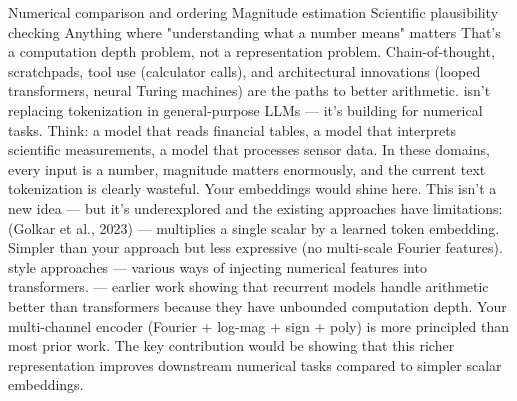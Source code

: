 {}\markdownRendererUlBeginTight
\markdownRendererUlItem Numerical comparison and ordering\markdownRendererUlItemEnd 
\markdownRendererUlItem Magnitude estimation\markdownRendererUlItemEnd 
\markdownRendererUlItem Scientific plausibility checking\markdownRendererUlItemEnd 
\markdownRendererUlItem Anything where "understanding what a number means" matters\markdownRendererUlItemEnd 
\markdownRendererUlEndTight \markdownRendererInterblockSeparator
{} That's a computation depth problem, not a representation problem. Chain-of-thought, scratchpads, tool use (calculator calls), and architectural innovations (looped transformers, neural Turing machines) are the paths to better arithmetic.\markdownRendererParagraphSeparator
{} isn't replacing tokenization in general-purpose LLMs — it's building  for numerical tasks. Think: a model that reads financial tables, a model that interprets scientific measurements, a model that processes sensor data. In these domains, every input is a number, magnitude matters enormously, and the current text tokenization is clearly wasteful. Your embeddings would shine here.\markdownRendererInterblockSeparator
{}
\markdownRendererSectionEnd \markdownRendererSectionBegin
{}\markdownRendererInterblockSeparator
{}This isn't a new idea — but it's underexplored and the existing approaches have limitations:\markdownRendererInterblockSeparator
{}\markdownRendererUlBeginTight
\markdownRendererUlItem {} (Golkar et al., 2023) — multiplies a single scalar by a learned token embedding. Simpler than your approach but less expressive (no multi-scale Fourier features).\markdownRendererUlItemEnd 
\markdownRendererUlItem {} style approaches — various ways of injecting numerical features into transformers.\markdownRendererUlItemEnd 
\markdownRendererUlItem {} — earlier work showing that recurrent models handle arithmetic better than transformers because they have unbounded computation depth.\markdownRendererUlItemEnd 
\markdownRendererUlEndTight \markdownRendererInterblockSeparator
{}Your multi-channel encoder (Fourier + log-mag + sign + poly) is more principled than most prior work. The key contribution would be showing that this richer representation improves downstream numerical tasks compared to simpler scalar embeddings.\markdownRendererInterblockSeparator
